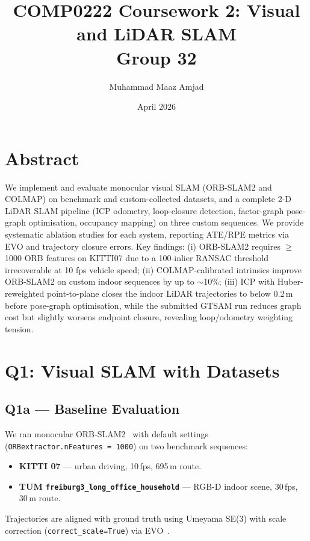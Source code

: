 \documentclass[10pt,twocolumn]{article}
\title{\textbf{COMP0222 Coursework 2: Visual and LiDAR SLAM}\\
       \large Group 32}
\author{Muhammad Maaz Amjad}
\date{April 2026}
\begin{document}
\maketitle

\section*{Abstract}
We implement and evaluate monocular visual SLAM (ORB-SLAM2 and COLMAP) on
benchmark and custom-collected datasets, and a complete 2-D LiDAR SLAM pipeline
(ICP odometry, loop-closure detection, factor-graph pose-graph optimisation,
occupancy mapping) on three custom sequences.  We provide systematic ablation
studies for each system, reporting ATE/RPE metrics via EVO and trajectory
closure errors.  Key findings: (i) ORB-SLAM2 requires $\geq$1000 ORB features
on KITTI07 due to a 100-inlier RANSAC threshold irrecoverable at 10 fps vehicle
speed; (ii) COLMAP-calibrated intrinsics improve ORB-SLAM2 on custom indoor
sequences by up to $\sim$10\%; (iii) ICP with Huber-reweighted point-to-plane
closes the indoor LiDAR trajectories to below 0.2\,m before pose-graph
optimisation, while the submitted GTSAM run reduces graph cost but slightly
worsens endpoint closure, revealing loop/odometry weighting tension.

\section{Q1: Visual SLAM with Datasets}

\subsection{Q1a — Baseline Evaluation}

We ran monocular ORB-SLAM2~\cite{murORB2} with default settings
(\texttt{ORBextractor.nFeatures = 1000}) on two benchmark sequences:

\begin{itemize}
  \item \textbf{KITTI 07} — urban driving, 10\,fps, 695\,m route.
  \item \textbf{TUM \texttt{freiburg3\_long\_office\_household}} —
        RGB-D indoor scene, 30\,fps, 30\,m route.
\end{itemize}

Trajectories are aligned with ground truth using Umeyama SE(3) with scale
correction (\texttt{correct\_scale=True}) via EVO~\cite{grupp2017evo}.
\end{document}
